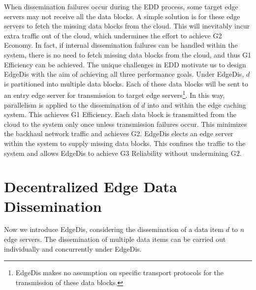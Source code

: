 \documentclass[10pt,journal,compsoc]{IEEEtran}
\begin{document}
When dissemination failures occur during the EDD process, some target edge servers may not receive all the data blocks. A simple solution is for these edge servers to fetch the missing data blocks from the cloud. This will inevitably incur extra traffic out of the cloud, which undermines the effort to achieve G2 Economy. In fact, if internal dissemination failures can be handled within the system, there is no need to fetch missing data blocks from the cloud, and thus G1 Efficiency can be achieved. The unique challenges in EDD motivate us to design EdgeDis with the aim of achieving all three performance goals. Under EdgeDis, $d$ is partitioned into multiple data blocks. Each of these data blocks will be sent to an entry edge server for transmission to target edge servers\footnote{EdgeDis makes no assumption on specific transport protocols for the transmission of these data blocks.}. In this way, parallelism is applied to the dissemination of $d$ into and within the edge caching system. This achieves G1 Efficiency. Each data block is transmitted from the cloud to the system only once unless transmission failures occur. This minimizes the backhaul network traffic and achieves G2. EdgeDis elects an edge server within the system to supply missing data blocks. This confines the traffic to the system and allows EdgeDis to achieve G3 Reliability without undermining G2.%


%
\section{Decentralized Edge Data Dissemination}
\label{Sec:Reliable_EDD}

Now we introduce EdgeDis, considering the dissemination of a data item $d$ to $n$ edge servers. The dissemination of multiple data items can be carried out individually and concurrently under EdgeDis.
\end{document}
